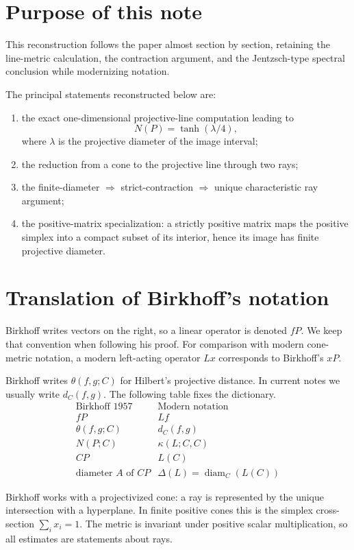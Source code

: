 \documentclass[11pt]{article}
\newcommand{\diam}{\operatorname{diam}}
\begin{document}
\section*{Purpose of this note}
This reconstruction follows the paper almost section by section, retaining the line-metric calculation, the contraction argument, and the Jentzsch-type spectral conclusion while modernizing notation.

The principal statements reconstructed below are:
\begin{enumerate}[leftmargin=2em]
\item the exact one-dimensional projective-line computation leading to
\[
  N(P)=\tanh(\lambda/4),
\]
where \(\lambda\) is the projective diameter of the image interval;
\item the reduction from a cone to the projective line through two rays;
\item the finite-diameter \(\Rightarrow\) strict-contraction \(\Rightarrow\) unique characteristic ray argument;
\item the positive-matrix specialization: a strictly positive matrix maps the positive simplex into a compact subset of its interior, hence its image has finite projective diameter.
\end{enumerate}

\section{Translation of Birkhoff's notation}
Birkhoff writes vectors on the right, so a linear operator is denoted \(fP\).  We keep that convention when following his proof.  For comparison with modern cone-metric notation, a modern left-acting operator \(Lx\) corresponds to Birkhoff's \(xP\).

Birkhoff writes \(\theta(f,g;C)\) for Hilbert's projective distance.  In current notes we usually write \(d_C(f,g)\).  The following table fixes the dictionary.
\[
\begin{array}{c|c}
\text{Birkhoff 1957} & \text{Modern notation}\\ \hline
fP & Lf\\
\theta(f,g;C) & d_C(f,g)\\
N(P;C) & \kappa(L;C,C)\\
CP & L(C)\\
\text{diameter }A\text{ of }CP & \Delta(L)=\diam_C(L(C))
\end{array}
\]

Birkhoff works with a projectivized cone: a ray is represented by the unique intersection with a hyperplane.  In finite positive cones this is the simplex cross-section \(\sum_i x_i=1\).  The metric is invariant under positive scalar multiplication, so all estimates are statements about rays.
\end{document}
